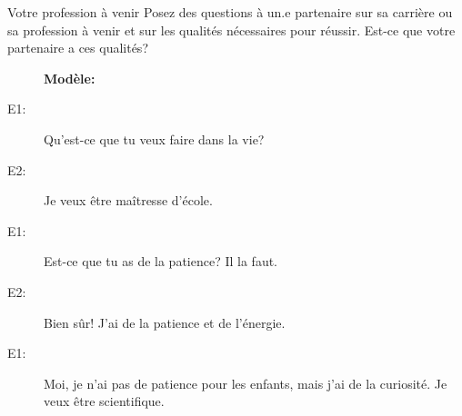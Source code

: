 \begin{frame}{Votre profession à venir}
  Posez des questions à un.e partenaire sur sa carrière ou sa profession à venir  et sur les qualités nécessaires pour réussir.
  Est-ce que votre partenaire a ces qualités?
  \begin{description}
    \item[] \textbf{Modèle:}
    \item[E1:] Qu'est-ce que tu veux faire dans la vie?
    \item[E2:] Je veux être maîtresse d'école.
    \item[E1:] Est-ce que tu as \alert{de la} patience? Il la faut.
    \item[E2:] Bien sûr! J'ai \alert{de la} patience et \alert{de l'}énergie.
    \item[E1:] Moi, je n'ai pas \alert{de} patience pour les enfants, mais j'ai \alert{de la curiosité}. Je veux être scientifique.
  \end{description}
\end{frame}